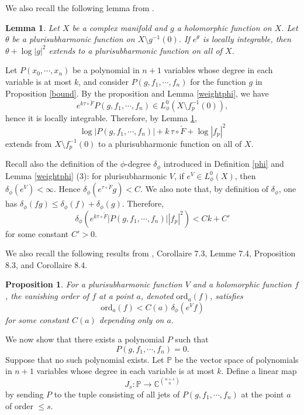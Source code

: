 \documentclass[a4paper, 12pt]{article}
\newtheorem{prop}[thm]{Proposition}
\newtheorem{lem}[thm]{Lemma}
\begin{document}
We also recall the following lemma from \cite[Lemme 12.8]{D85}.

\begin{lem}\label{prolong}
Let $X$ be a complex manifold and $g$ a holomorphic function on $X$. Let $\theta$ be a plurisubharmonic function on $X\setminus g^{-1}(0)$. If $e^\theta$ is locally integrable, then $\theta+\log|g|^2$ extends to a plurisubharmonic function on all of $X$.
\end{lem}

Let $P(x_0,\cdots,x_n)$ be a polynomial in $n+1$ variables whose degree in each variable is at most $k$, and consider $P(g,f_1,\cdots,f_n)$ for the function $g$ in Proposition \ref{bound}. By the proposition and Lemma \ref{weightphi}, we have
\[
e^{k\tau\circ\check F}P(g,f_1,\cdots,f_n)\in L_\phi^0(X\setminus f_p^{-1}(0)),
\]
hence it is locally integrable. Therefore, by Lemma \ref{prolong},
\[
\log|P(g,f_1,\cdots,f_n)|+k\,\tau\circ\check F+\log|f_p|^2
\]
extends from $X\setminus f_p^{-1}(0)$ to a plurisubharmonic function on all of $X$.

Recall also the definition of the $\phi$-degree $\delta_\phi$ introduced in Definition \ref{phi} and Lemma \ref{weightphi} (3): for plurisubharmonic $V$, if $e^V\in L_\phi^0(X)$, then $\delta_\phi(e^V)<\infty$. Hence $\delta_\phi(e^{\tau\circ\check F}g)<C$. We also note that, by definition of $\delta_\phi$, one has $\delta_\phi(fg) \le \delta_\phi(f) + \delta_\phi(g)$. Therefore, 
\[
\delta_\phi\left(e^{k\tau\circ\check F}|P(g,f_1,\cdots,f_n)||f_p|^2\right)<Ck+C'
\]
for some constant $C'>0$.

We also recall the following results from \cite{D85}, Corollaire 7.3, Lemme 7.4, Proposition 8.3, and Corollaire 8.4.

\begin{prop}\label{zero}
For a plurisubharmonic function $V$ and a holomorphic function $f$, the vanishing order of $f$ at a point $a$, denoted $\mathrm{ord}_a(f)$, satisfies
\[
\mathrm{ord}_a(f)<C(a)\,\delta_\phi(e^V f)
\]
for some constant $C(a)$ depending only on $a$.
\end{prop}

We now show that there exists a polynomial $P$ such that
\[
P(g,f_1,\cdots,f_n)=0.
\]
Suppose that no such polynomial exists. Let $\mathbb{P}$ be the vector space of polynomials in $n+1$ variables whose degree in each variable is at most $k$. Define a linear map
\[
J_s:\mathbb{P}\longrightarrow \mathbb{C}^{\binom{n+s}{n}}
\]
by sending $P$ to the tuple consisting of all jets of $P(g,f_1,\cdots,f_n)$ at the point $a$ of order $\le s$.
\end{document}

